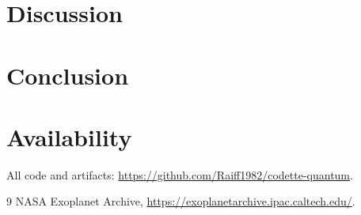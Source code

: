 \documentclass[11pt,a4paper]{article}
\begin{document}
\section{Discussion}

\section{Conclusion}

\section*{Availability}
All code and artifacts: \url{https://github.com/Raiff1982/codette-quantum}.


\begin{thebibliography}{9}
 NASA Exoplanet Archive, \url{https://exoplanetarchive.ipac.caltech.edu/}.
\end{thebibliography}
\end{document}

